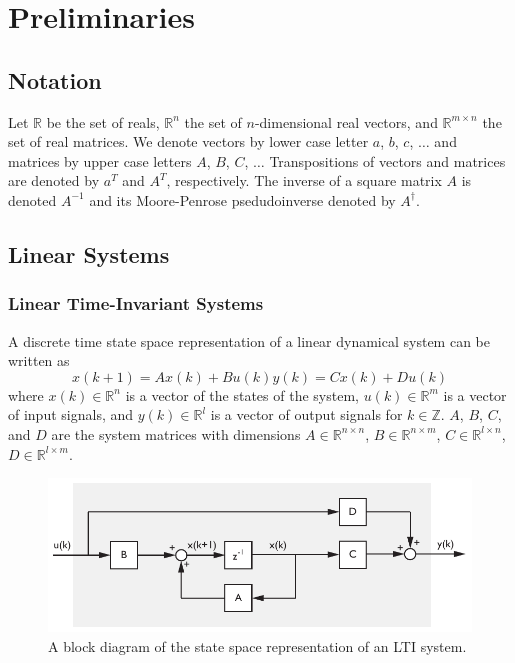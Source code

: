 \chapter{Preliminaries}

\section{Notation}
Let $\mathbb{R}$ be the set of reals, $\mathbb{R}^n$ the set of $n$-dimensional real vectors, and $\mathbb{R}^{m\times n}$ the set of real matrices. We denote vectors by lower case letter $a$, $b$, $c$, $\dots$ and matrices by upper case letters $A$, $B$, $C$, $\dots$ Transpositions of vectors and matrices are denoted by $a^T$ and $A^T$, respectively. The inverse of a square matrix $A$ is denoted $A^{-1}$ and its Moore-Penrose psedudoinverse denoted by $A^\dagger$.

\section{Linear Systems}
\subsection{Linear Time-Invariant Systems}\label{sec:linear_time_invariant_systems}
A discrete time state space representation of a linear dynamical system can be written as
\begin{subequations}\label{eq:2_lti}
\begin{equation}x(k+1) = Ax(k) + Bu(k)\end{equation}
\begin{equation}y(k) = Cx(k) + Du(k)\end{equation}
\end{subequations}
where $x(k) \in \mathbb{R}^n$ is a vector of the states of the system, $u(k) \in \mathbb{R}^m$ is a vector of input signals, and $y(k) \in \mathbb{R}^l$ is a vector of output signals for $k \in \mathbb{Z}$. $A$, $B$, $C$, and $D$ are the system matrices with dimensions $A\in\mathbb{R}^{n\times n}$, $B\in\mathbb{R}^{n\times m}$, $C\in\mathbb{R}^{l\times n}$, $D\in\mathbb{R}^{l\times m}$.
\begin{figure}[htb!]
	\centering
	\includegraphics{../fig/lti_block_diagram.pdf}
	\caption{A block diagram of the state space representation of an LTI system.}
\end{figure}

